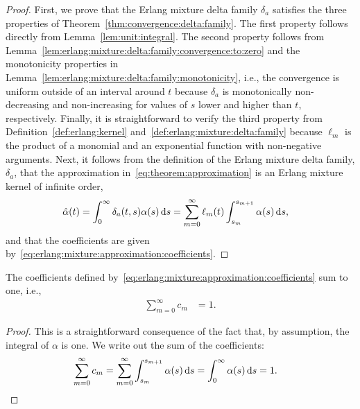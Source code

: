 \begin{proof}
	First, we prove that the Erlang mixture delta family $\delta_a$ satisfies the three properties of Theorem~\ref{thm:convergence:delta:family}. The first property follows directly from Lemma~\ref{lem:unit:integral}. The second property follows from Lemma~\ref{lem:erlang:mixture:delta:family:convergence:to:zero} and the monotonicity properties in Lemma~\ref{lem:erlang:mixture:delta:family:monotonicity}, i.e., the convergence is uniform outside of an interval around $t$ because $\delta_a$ is monotonically non-decreasing and non-increasing for values of $s$ lower and higher than $t$, respectively. Finally, it is straightforward to verify the third property from Definition~\ref{def:erlang:kernel} and~\ref{def:erlang:mixture:delta:family} because $\ell_m$ is the product of a monomial and an exponential function with non-negative arguments. Next, it follows from the definition of the Erlang mixture delta family, $\delta_a$, that the approximation in~\eqref{eq:theorem:approximation} is an Erlang mixture kernel of infinite order,
	\begin{align}
		\hat \alpha(t)
		&= \int_0^\infty \delta_a(t, s) \alpha(s) \,\mathrm{d} s
		 = \sum_{m=0}^\infty \ell_m(t) \int_{s_m}^{s_{m+1}} \alpha(s) \,\mathrm{d} s,
	\end{align}
	and that the coefficients are given by~\eqref{eq:erlang:mixture:approximation:coefficients}.
\end{proof}
%
\begin{corollary}
	The coefficients defined by~\eqref{eq:erlang:mixture:approximation:coefficients} sum to one, i.e.,
	\begin{align}
		\sum_{m=0}^\infty c_m &= 1.
	\end{align}
\end{corollary}
%
\begin{proof}
	This is a straightforward consequence of the fact that, by assumption, the integral of $\alpha$ is one. We write out the sum of the coefficients:
	\begin{align}
		\sum_{m=0}^\infty c_m &= \sum_{m=0}^\infty \int_{s_m}^{s_{m+1}} \alpha(s) \,\mathrm{d} s = \int_0^\infty \alpha(s) \,\mathrm{d} s = 1.
	\end{align}
\end{proof}
%
